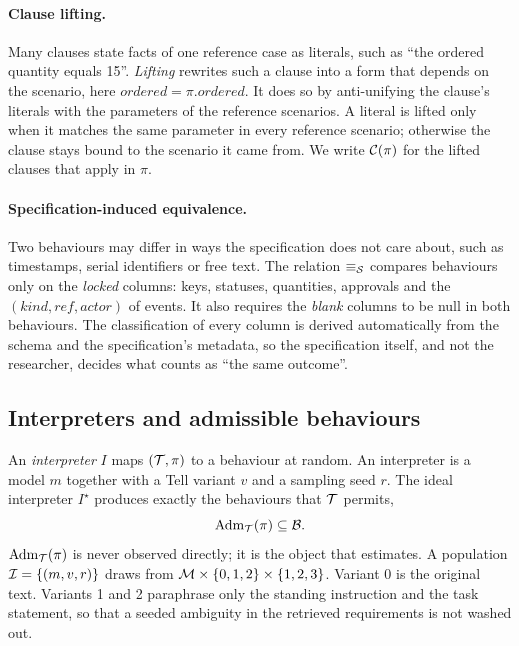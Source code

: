 \paragraph{Clause lifting.} Many clauses state facts of one reference case as literals, such as ``the ordered quantity equals 15''. \emph{Lifting} rewrites such a clause into a form that depends on the scenario, here $\textit{ordered}=\pi.\textit{ordered}$. It does so by anti-unifying the clause's literals with the parameters of the reference scenarios. A literal is lifted only when it matches the same parameter in every reference scenario; otherwise the clause stays bound to the scenario it came from. We write $\mathcal{C}(\pi)$ for the lifted clauses that apply in $\pi$.

\paragraph{Specification-induced equivalence.} Two behaviours may differ in ways the specification does not care about, such as timestamps, serial identifiers or free text. The relation $\equiv_{\mathcal{S}}$ compares behaviours only on the \emph{locked} columns: keys, statuses, quantities, approvals and the $(\textit{kind},\textit{ref},\textit{actor})$ of events. It also requires the \emph{blank} columns to be null in both behaviours. The classification of every column is derived automatically from the schema and the specification's metadata, so the specification itself, and not the researcher, decides what counts as ``the same outcome''.

\subsection{Interpreters and admissible behaviours}

An \emph{interpreter} $I$ maps $(\mathcal{T},\pi)$ to a behaviour at random. An interpreter is a model $m$ together with a Tell variant $v$ and a sampling seed $r$. The ideal interpreter $I^\star$ produces exactly the behaviours that $\mathcal{T}$ permits,
\begin{equation}
\label{eq:adm}
\mathrm{Adm}_{\mathcal{T}}(\pi)\subseteq\mathcal{B} .
\end{equation}
$\mathrm{Adm}_{\mathcal{T}}(\pi)$ is never observed directly; it is the object that \specdx estimates. A population $\mathcal{I}=\{(m,v,r)\}$ draws from $\mathcal{M}\times\{0,1,2\}\times\{1,2,3\}$. Variant 0 is the original text. Variants 1 and 2 paraphrase only the standing instruction and the task statement, so that a seeded ambiguity in the retrieved requirements is not washed out.

